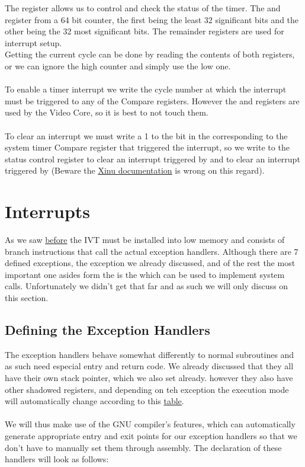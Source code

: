 \documentclass[12pt, svgnames]{book}
\begin{document}
The  register allows us to control and check the status of the timer. The  and  register from a 64 bit counter,  the first being the least 32 significant bits and the other being the 32 most significant bits. The remainder registers are used for interrupt setup.
\\
Getting the current cycle can be done by reading the contents of both registers, or we can ignore the high counter and simply use the low one.
\\~\\
To enable a timer interrupt we write the cycle number at which the interrupt must be triggered to any of the Compare registers. However the  and  registers are used by the Video Core, so it is best to not touch them. 
\\~\\
To clear an interrupt we must write a 1 to the bit in the  corresponding to the system timer Compare register that triggered the interrupt, so we write  to the status control register to clear an interrupt triggered by  and  to clear an interrupt triggered by  (Beware the \href{http://embedded-xinu.readthedocs.io/en/latest/arm/rpi/BCM2835-System-Timer.html}{Xinu documentation} is wrong on this regard).
\section{Interrupts}
\label{sec:Interrupts}

As we saw \hyperref[sec:IVT]{before} the IVT must be installed into low memory and consists of branch instructions that call the actual exception handlers. Although there are 7 defined exceptions, the  exception we already discussed, and of the rest the most important one asides form the  is the  which can be used to implement system calls. Unfortunately we didn't get that far and as such we will only discuss  on this section.

\subsection{Defining the Exception Handlers}
The exception handlers behave somewhat differently to normal subroutines and as such need especial entry and return code. We already discussed that they all have their own stack pointer, which we also set already. however they also have other shadowed registers, and depending on teh exception the execution mode will automatically change according to this \hyperlink{arm modes}{table}.
\\~\\
We will thus make use of the GNU compiler's features, which can automatically generate appropriate entry and exit points for our exception handlers so that we don't have to manually set them through assembly. The declaration of these handlers will look as follows:
\end{document}
